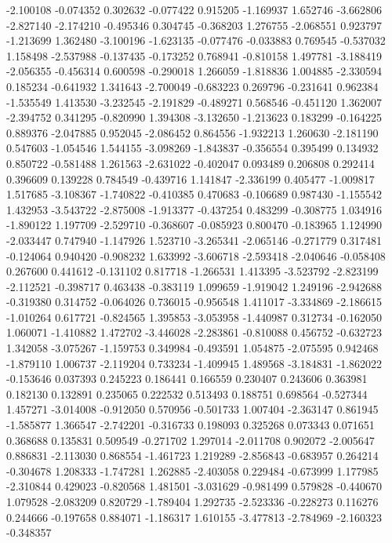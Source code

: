 -2.100108
-0.074352
0.302632
-0.077422
0.915205
-1.169937
1.652746
-3.662806
-2.827140
-2.174210
-0.495346
0.304745
-0.368203
1.276755
-2.068551
0.923797
-1.213699
1.362480
-3.100196
-1.623135
-0.077476
-0.033883
0.769545
-0.537032
1.158498
-2.537988
-0.137435
-0.173252
0.768941
-0.810158
1.497781
-3.188419
-2.056355
-0.456314
0.600598
-0.290018
1.266059
-1.818836
1.004885
-2.330594
0.185234
-0.641932
1.341643
-2.700049
-0.683223
0.269796
-0.231641
0.962384
-1.535549
1.413530
-3.232545
-2.191829
-0.489271
0.568546
-0.451120
1.362007
-2.394752
0.341295
-0.820990
1.394308
-3.132650
-1.213623
0.183299
-0.164225
0.889376
-2.047885
0.952045
-2.086452
0.864556
-1.932213
1.260630
-2.181190
0.547603
-1.054546
1.544155
-3.098269
-1.843837
-0.356554
0.395499
0.134932
0.850722
-0.581488
1.261563
-2.631022
-0.402047
0.093489
0.206808
0.292414
0.396609
0.139228
0.784549
-0.439716
1.141847
-2.336199
0.405477
-1.009817
1.517685
-3.108367
-1.740822
-0.410385
0.470683
-0.106689
0.987430
-1.155542
1.432953
-3.543722
-2.875008
-1.913377
-0.437254
0.483299
-0.308775
1.034916
-1.890122
1.197709
-2.529710
-0.368607
-0.085923
0.800470
-0.183965
1.124990
-2.033447
0.747940
-1.147926
1.523710
-3.265341
-2.065146
-0.271779
0.317481
-0.124064
0.940420
-0.908232
1.633992
-3.606718
-2.593418
-2.040646
-0.058408
0.267600
0.441612
-0.131102
0.817718
-1.266531
1.413395
-3.523792
-2.823199
-2.112521
-0.398717
0.463438
-0.383119
1.099659
-1.919042
1.249196
-2.942688
-0.319380
0.314752
-0.064026
0.736015
-0.956548
1.411017
-3.334869
-2.186615
-1.010264
0.617721
-0.824565
1.395853
-3.053958
-1.440987
0.312734
-0.162050
1.060071
-1.410882
1.472702
-3.446028
-2.283861
-0.810088
0.456752
-0.632723
1.342058
-3.075267
-1.159753
0.349984
-0.493591
1.054875
-2.075595
0.942468
-1.879110
1.006737
-2.119204
0.733234
-1.409945
1.489568
-3.184831
-1.862022
-0.153646
0.037393
0.245223
0.186441
0.166559
0.230407
0.243606
0.363981
0.182130
0.132891
0.235065
0.222532
0.513493
0.188751
0.698564
-0.527344
1.457271
-3.014008
-0.912050
0.570956
-0.501733
1.007404
-2.363147
0.861945
-1.585877
1.366547
-2.742201
-0.316733
0.198093
0.325268
0.073343
0.071651
0.368688
0.135831
0.509549
-0.271702
1.297014
-2.011708
0.902072
-2.005647
0.886831
-2.113030
0.868554
-1.461723
1.219289
-2.856843
-0.683957
0.264214
-0.304678
1.208333
-1.747281
1.262885
-2.403058
0.229484
-0.673999
1.177985
-2.310844
0.429023
-0.820568
1.481501
-3.031629
-0.981499
0.579828
-0.440670
1.079528
-2.083209
0.820729
-1.789404
1.292735
-2.523336
-0.228273
0.116276
0.244666
-0.197658
0.884071
-1.186317
1.610155
-3.477813
-2.784969
-2.160323
-0.348357
